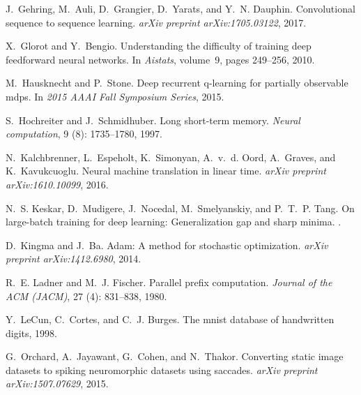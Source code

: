 \documentclass{article}
\begin{document}
\begin{thebibliography}{19}
J.~Gehring, M.~Auli, D.~Grangier, D.~Yarats, and Y.~N. Dauphin.
\newblock Convolutional sequence to sequence learning.
\newblock \emph{arXiv preprint arXiv:1705.03122}, 2017.

X.~Glorot and Y.~Bengio.
\newblock Understanding the difficulty of training deep feedforward neural
  networks.
\newblock In \emph{Aistats}, volume~9, pages 249--256, 2010.

M.~Hausknecht and P.~Stone.
\newblock Deep recurrent q-learning for partially observable mdps.
\newblock In \emph{2015 AAAI Fall Symposium Series}, 2015.

S.~Hochreiter and J.~Schmidhuber.
\newblock Long short-term memory.
\newblock \emph{Neural computation}, 9 (8): 1735--1780, 1997.

N.~Kalchbrenner, L.~Espeholt, K.~Simonyan, A.~v.~d. Oord, A.~Graves, and
  K.~Kavukcuoglu.
\newblock Neural machine translation in linear time.
\newblock \emph{arXiv preprint arXiv:1610.10099}, 2016.

N.~S. Keskar, D.~Mudigere, J.~Nocedal, M.~Smelyanskiy, and P.~T.~P. Tang.
\newblock On large-batch training for deep learning: Generalization gap and
  sharp minima.
.

D.~Kingma and J.~Ba.
\newblock Adam: A method for stochastic optimization.
\newblock \emph{arXiv preprint arXiv:1412.6980}, 2014.

R.~E. Ladner and M.~J. Fischer.
\newblock Parallel prefix computation.
\newblock \emph{Journal of the ACM (JACM)}, 27 (4): 831--838,
  1980.

Y.~LeCun, C.~Cortes, and C.~J. Burges.
\newblock The mnist database of handwritten digits, 1998.

G.~Orchard, A.~Jayawant, G.~Cohen, and N.~Thakor.
\newblock Converting static image datasets to spiking neuromorphic datasets
  using saccades.
\newblock \emph{arXiv preprint arXiv:1507.07629}, 2015.


\end{thebibliography}
\end{document}
